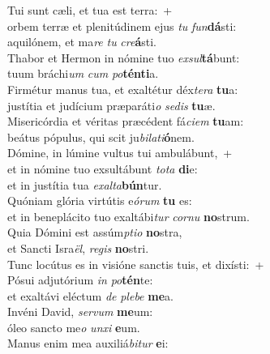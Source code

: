 \evenverse Tui sunt cæli, et tua est terra:~+\\
\evenverse  orbem terræ et plenitúdinem ejus \textit{tu} \textit{fun}\textbf{dá}sti:~\*\\
\evenverse aquilónem, et ma\textit{re} \textit{tu} \textit{cre}\textbf{á}sti.\\
\oddverse Thabor et Hermon in nómine tuo \textit{ex}\textit{sul}\textbf{tá}bunt:~\*\\
\oddverse tuum bráchi\textit{um} \textit{cum} \textit{po}\textbf{tén}\textbf{ti}a.\\
\evenverse Firmétur manus tua, et exaltétur déx\textit{te}\textit{ra} \textbf{tu}a:~\*\\
\evenverse justítia et judícium præparáti\textit{o} \textit{se}\textit{dis} \textbf{tu}æ.\\
\oddverse Misericórdia et véritas præcédent fá\textit{ci}\textit{em} \textbf{tu}am:~\*\\
\oddverse beátus pópulus, qui scit ju\textit{bi}\textit{la}\textit{ti}\textbf{ó}nem.\\
\evenverse Dómine, in lúmine vultus tui ambulábunt,~+\\
\evenverse  et in nómine tuo exsultábunt \textit{to}\textit{ta} \textbf{di}e:~\*\\
\evenverse et in justítia tua \textit{e}\textit{xal}\textit{ta}\textbf{bún}tur.\\
\oddverse Quóniam glória virtútis e\textit{ó}\textit{rum} \textbf{tu} es:~\*\\
\oddverse et in beneplácito tuo exaltábi\textit{tur} \textit{cor}\textit{nu} \textbf{no}strum.\\
\evenverse Quia Dómini est assúm\textit{pti}\textit{o} \textbf{no}stra,~\*\\
\evenverse et Sancti Isra\textit{ël}, \textit{re}\textit{gis} \textbf{no}stri.\\
\oddverse Tunc locútus es in visióne sanctis tuis, et dixísti:~+\\
\oddverse  Pósui adjutórium \textit{in} \textit{po}\textbf{tén}te:~\*\\
\oddverse et exaltávi eléctum \textit{de} \textit{ple}\textit{be} \textbf{me}a.\\
\evenverse Invéni David, \textit{ser}\textit{vum} \textbf{me}um:~\*\\
\evenverse óleo sancto me\textit{o} \textit{un}\textit{xi} \textbf{e}um.\\
\oddverse Manus enim mea auxiliá\textit{bi}\textit{tur} \textbf{e}i:~\*\\
